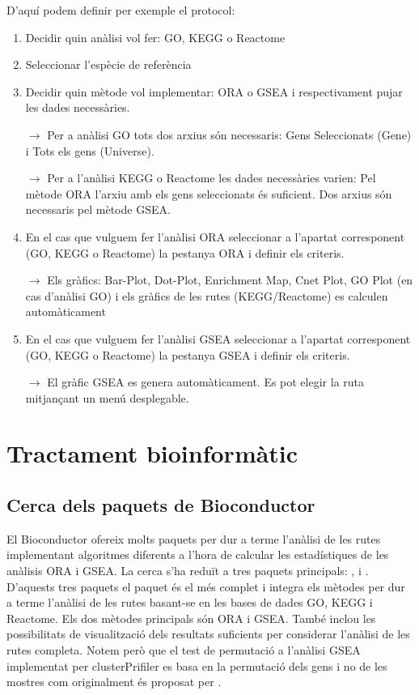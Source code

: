 D'aquí podem definir per exemple el protocol:
\begin{enumerate}
\item Decidir quin anàlisi vol fer: \gls{GO}, \gls{KEGG} o Reactome
\item Seleccionar l'espècie de referència
\item Decidir quin mètode vol implementar: \gls{ORA} o \gls{GSEA} i respectivament pujar les dades necessàries.

$\rightarrow$ Per a anàlisi \gls{GO} tots dos arxius són necessaris: Gens Seleccionats (Gene) i Tots els gens (Universe). 

$\rightarrow$ Per a l'anàlisi \gls{KEGG} o Reactome les dades necessàries varien: Pel mètode \gls{ORA} l'arxiu amb els gens seleccionats és suficient. Dos arxius són necessaris pel mètode \gls{GSEA}.
\item En el cas que vulguem fer l’anàlisi \gls{ORA} seleccionar a l'apartat corresponent (\gls{GO}, \gls{KEGG} o Reactome) la pestanya \gls{ORA} i definir els criteris.

$\rightarrow$ Els gràfics: \gls{Bar-Plot}, \gls{Dot-Plot}, \gls{Enrichment Map}, Cnet Plot, GO Plot (en cas d'anàlisi \gls{GO}) i els gràfics de les rutes (\gls{KEGG}/Reactome) es calculen automàticament

\item En el cas que vulguem fer l'anàlisi \gls{GSEA} seleccionar a l'apartat corresponent (\gls{GO}, \gls{KEGG} o Reactome) la pestanya \gls{GSEA} i definir els criteris.

$\rightarrow$ El gràfic GSEA es genera automàticament. Es pot elegir la ruta mitjançant un menú desplegable.

\end{enumerate}

\chapter{Tractament bioinformàtic}

\section{Cerca dels paquets de \gls{Bioconductor}}
El \gls{Bioconductor} ofereix molts paquets per dur a terme l'anàlisi de les rutes implementant algoritmes diferents a l'hora de calcular les estadístiques de les anàlisis \gls{ORA} i \gls{GSEA}. La cerca s'ha reduït a tres paquets principals: ,  i . D'aquests tres paquets el paquet  és el més complet i integra els mètodes per dur a terme l'anàlisi de les rutes basant-se en les bases de dades \gls{GO}, \gls{KEGG} i Reactome. Els dos mètodes principals són \gls{ORA} i \gls{GSEA}. També inclou les possibilitats de visualització dels resultats suficients per considerar l'anàlisi de les rutes completa. Notem però que el test de permutació a l'anàlisi \gls{GSEA} implementat per clusterPrifiler es basa en la permutació dels gens i no de les mostres com originalment és proposat per \cite{subramanian2005gene}.

